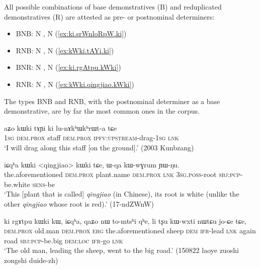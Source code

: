 All possible combinations of base demonstratives (B) and reduplicated demonstratives (R) are attested as pre- or postnominal determiners:

\begin{itemize}
\item BNB:  N ,  N  (\ref{ex:ki.srWnloRpW.ki})
\item RNB:  N ,  N  (\ref{ex:kWki.tAYi.ki})
\item BNR:  N ,  N  (\ref{ex:ki.rgAtpu.kWki})
\item RNR:  N ,  N  (\ref{ex:kWki.qingjiao.kWki})
\end{itemize}  

The types BNB and RNB, with the postnominal determiner as a base demonstrative, are by far the most common ones in the corpus.

\begin{exe}
\ex \label{ex:kWki.tAYi.ki}
 \gll  aʑo kɯki tɤɲi ki lu-nɤkʰɯkʰrɯt-a tɕe \\
 \textsc{1sg} \textsc{dem}.\textsc{prox} staff \textsc{dem}.\textsc{prox} \textsc{ipfv}:\textsc{upstream}-drag-\textsc{1sg} \textsc{lnk} \\
 \glt `I will drag along this staff [on the ground].' (2003 Kunbzang)
\end{exe}
 

\begin{exe}
\ex \label{ex:kWki.qingjiao.kWki}
 \gll iɕqʰa kɯki <qingjiao> kɯki tɕe, ɯ-qa kɯ-wɣrum ɲɯ-ŋu. \\
 the.aforementioned \textsc{dem}.\textsc{prox} plant.name \textsc{dem}.\textsc{prox} \textsc{lnk} \textsc{3sg}.\textsc{poss}-root \textsc{sbj}:\textsc{pcp}-be.white \textsc{sens}-be \\
 \glt `This [plant that is called]  \textit{qingjiao} (in Chinese), its root is white (unlike the other \textit{qingjiao} whose root is red).' (17-ndZWnW) 
\end{exe}

\begin{exe}
\ex \label{ex:ki.rgAtpu.kWki}
 \gll ki rgɤtpu kɯki kɯ, iɕqʰa, qaʑo nɯ to-mtsʰi qʰe, li tʂu kɯ-wxti nɯtɕu jo-ɕe tɕe, \\
\textsc{dem}.\textsc{prox} old.man \textsc{dem}.\textsc{prox} \textsc{erg} the.aforementioned sheep \textsc{dem} \textsc{ifr}-lead \textsc{lnk} again road \textsc{sbj}:\textsc{pcp}-be.big \textsc{dem}:\textsc{loc} \textsc{ifr}-go \textsc{lnk} \\
\glt `The old man, leading the sheep, went to the big road.' (150822 laoye zuoshi zongshi duide-zh)
\end{exe}

